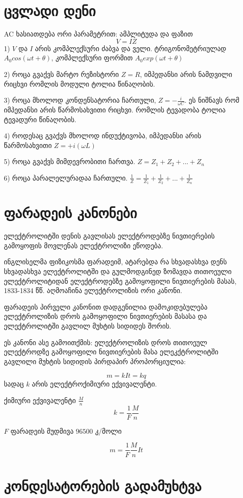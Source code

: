 \documentclass{book}
\begin{document}
\section{ცვლადი დენი}

AC ხასიათდება ორი პარამეტრით: ამპლიტუდა და ფაზით
$$V = IZ$$
1) $V$ და $I$ არის კომპლექსური ძაბვა და ველი. ტრიგონომეტრიულად $A_0cos(\omega t + \theta)$, კომპლექსური ფორმით $A_0exp(\omega t + \theta)$

2) როცა გვაქვს მარტო რეზისტორი $Z=R$, იმპედანსი არის ნამდვილი რიცხვი რომლის მოდული ტოლია წინაღობის.

3) როცა მხოლოდ კონდენსატორია ჩართული, $Z=-\frac{i}{\omega C}$. ეს ნიშნავს რომ იმპედანსი არის წარმოსახვითი რიცხვი. რომლის ტევადობა ტოლია ტევადური წინაღობის.

4) როდესაც გვაქვს მხოლოდ ინდუქტივობა, იმპედანსი არის წარმოსახვითი $Z = + i(\omega L)$ 

5) როცა გვაქვს მიმდევრობითი ჩართვა. $Z = Z_1 + Z_2 + ... + Z_n$

6) როცა პარალელურადაა ჩართული. $\frac{1}{Z} = \frac{1}{Z_1} + \frac{1}{Z_2} + ... + \frac{1}{Z_n}$

\section{ფარადეის კანონები}

ელექტროლიტში დენის გავლისას ელექტროდებზე ნივთიერების გამოყოფის მოვლენას ელექტროლიზი ეწოდება.

ინგლისელმა ფიზიკოსმა ფარადეიმ, ატარებდა რა სხვადასხვა დენს
სხვადასხვა ელექტროლიტში და გულმოდგინედ ზომავდა თითოეული
ელექტროლიტიდან ელექტროდებზე გამოყოფილი ნივთიერების მასას,
1833-1834 წწ. აღმოაჩინა ელექტროლიზის ორი კანონი.

ფარადეის პირველი კანონით დადგენილია დამოკიდებულება ელექტროლიზის დროს გამოყოფილი ნივთიერების მასასა და ელექტროლიტში გავლილ მუხტის სიდიდეს შორის. 

ეს კანონი ასე გამოითქმის: ელექტროლიზის დროს თითოეულ ელექტროდზე გამოყოფილი ნივთიერების მასა ელეკქტროლიტში გავლილი მუხტის სიდიდის პირდაპირ პროპორციულია:

$$m = kIt = kq$$
სადაც $k$ არის ელექტროქიმიური ექვივალენტი.

ქიმიური ექვივალენტი $\frac{M}{n}$
$$k = \frac{1}{F}\frac{M}{n}$$

$F$ ფარადეის მუდმივა $96500$ კ/მოლი

$$m = \frac{1}{F}\frac{M}{n}It$$

\section{კონდესატორების გადამუხტვა}
\end{document}
